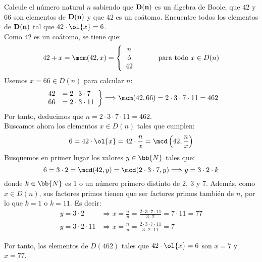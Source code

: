 \begin{ejercicio}
    Calcule el número natural $n$ sabiendo que $\bf{D}(n)$ es un álgebra de Boole,
    que $42$ y $66$ son elementos de $\bf{D}(n)$ y que $42$ es un coátomo.
    Encuentre todos los elementos de $\bf{D}(n)$ tal que $42\cdot \ol{x}=6$.\\

    Como $42$ es un coátomo, se tiene que:
    \begin{equation*}
        42 + x = \mcm(42,x) = \left\{
            \begin{array}{c}
                n \\
                \text{ó} \\
                42
            \end{array}
        \right.
        \hspace{1cm} \text{para todo } x\in D(n)
    \end{equation*}
    Usemos $x=66\in D(n)$ para calcular $n$:
    \begin{equation*}
        \left.
            \begin{array}{rl}
                42 &= 2\cdot 3\cdot 7\\
                66 &= 2\cdot 3\cdot 11
            \end{array}
        \right\} \Longrightarrow \mcm(42,66)=2\cdot 3\cdot 7\cdot 11=462
    \end{equation*}
    Por tanto, deducimos que $n=2\cdot 3\cdot 7\cdot 11=462$.\\
    
    Buscamos ahora los elementos $x\in D(n)$ tales que cumplen:
    \begin{equation*}
        6 = 42\cdot \ol{x} = 42\cdot \frac{n}{x} = \mcd\left(42,\frac{n}{x}\right)
    \end{equation*}
    Busquemos en primer lugar los valores $y\in \bb{N}$ tales que:
    \begin{equation*}
        6 = 3\cdot 2 = \mcd(42,y) = \mcd(2\cdot 3\cdot 7,y) \Longrightarrow
        y = 3\cdot 2 \cdot k
    \end{equation*}
    donde $k\in \bb{N}$ es $1$ o un número primero distinto de $2,~3$ y $7$. Además, como $x\in D(n)$,
    sus factores primos tienen que ser factores primos también de $n$, por lo que $k=1$ o $k=11$. Es decir:
    \begin{align*}
        y = 3\cdot 2 &\Longrightarrow x = \frac{n}{y} = \frac{2\cdot 3\cdot 7\cdot 11}{3\cdot 2} = 7\cdot 11 = 77\\
        y = 3\cdot 2\cdot 11 &\Longrightarrow x = \frac{n}{y} = \frac{2\cdot 3\cdot 7\cdot 11}{3\cdot 2\cdot 11} = 7
    \end{align*}

    Por tanto, los elementos de $D(462)$ tales que $42\cdot \ol{x}=6$ son $x=7$ y $x=77$.
\end{ejercicio}


